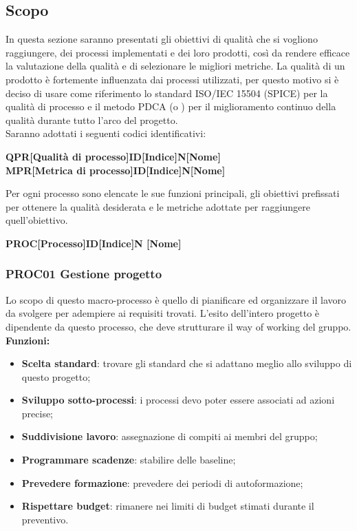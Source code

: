 \documentclass[../piano_di_qualifica.tex]{subfiles}
\begin{document}
\subsection{Scopo}
In questa sezione saranno presentati gli obiettivi di qualità che si vogliono raggiungere, dei processi implementati e dei loro prodotti, così da rendere efficace la valutazione della qualità e di selezionare le migliori metriche.
La qualità di un prodotto è fortemente influenzata dai processi utilizzati, per questo motivo si è deciso di usare come riferimento lo standard ISO/IEC 15504 (SPICE) per la qualità di processo e il metodo PDCA (o ) per il miglioramento continuo della qualità durante tutto l'arco del progetto.\\
Saranno adottati i seguenti codici identificativi:\par

\begin{center}
	\textbf{QPR[Qualità di processo]ID[Indice]N[Nome]}\\
	\textbf{MPR[Metrica di processo]ID[Indice]N[Nome]}
\end{center}

Per ogni processo sono elencate le sue funzioni principali, gli obiettivi prefissati per ottenere la qualità desiderata e le metriche adottate per raggiungere quell’obiettivo.

\begin{center}
	\textbf{PROC[Processo]ID[Indice]N [Nome]}
\end{center}

\subsubsection{PROC01 Gestione progetto}
Lo scopo di questo macro-processo è quello di pianificare ed organizzare il lavoro da svolgere per adempiere ai requisiti trovati. L'esito dell'intero progetto è dipendente da questo processo, che deve strutturare il way of working del gruppo. \\

\setlength{\parindent}{0pt}\textbf{Funzioni:}
\smallbreak
\begin{itemize}
	\item \textbf{Scelta standard}: trovare gli standard che si adattano meglio allo sviluppo di questo progetto;
	\item \textbf{Sviluppo sotto-processi}: i processi devo poter essere associati ad azioni precise;
	\item \textbf{Suddivisione lavoro}: assegnazione di compiti ai membri del gruppo;
	\item \textbf{Programmare scadenze}: stabilire delle baseline;
	\item \textbf{Prevedere formazione}: prevedere dei periodi di autoformazione;
	\item \textbf{Rispettare budget}: rimanere nei limiti di budget stimati durante il preventivo.
\end{itemize}
\end{document}
